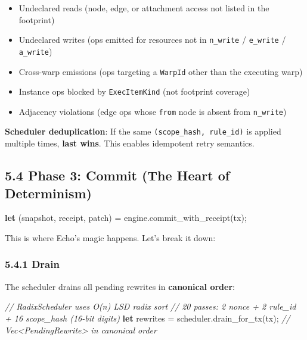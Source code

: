 \documentclass[
]{book}
\newenvironment{Shaded}{}{}
\newcommand{\CommentTok}[1]{\textcolor[rgb]{0.38,0.63,0.69}{\textit{#1}}}
\newcommand{\KeywordTok}[1]{\textcolor[rgb]{0.00,0.44,0.13}{\textbf{#1}}}
\newcommand{\NormalTok}[1]{#1}
\newcommand{\OperatorTok}[1]{\textcolor[rgb]{0.40,0.40,0.40}{#1}}
\begin{document}
\begin{itemize}
\item Undeclared reads (node, edge, or attachment access not listed in the footprint)
\item Undeclared writes (ops emitted for resources not in \texttt{n\_write} / \texttt{e\_write} / \texttt{a\_write})
\item Cross-warp emissions (ops targeting a \texttt{WarpId} other than the executing warp)
\item Instance ops blocked by \texttt{ExecItemKind} (not footprint coverage)
\item Adjacency violations (edge ops whose \texttt{from} node is absent from \texttt{n\_write})
\end{itemize}

\textbf{Scheduler deduplication}: If the same
\texttt{(scope\_hash,\ rule\_id)} is applied multiple times,
\textbf{last wins}. This enables idempotent retry semantics.

\subsection{5.4 Phase 3: Commit (The Heart of
Determinism)}\label{phase-3-commit-the-heart-of-determinism}

\begin{Shaded}
\begin{Highlighting}[]
\KeywordTok{let}\NormalTok{ (snapshot}\OperatorTok{,}\NormalTok{ receipt}\OperatorTok{,}\NormalTok{ patch) }\OperatorTok{=}\NormalTok{ engine}\OperatorTok{.}\NormalTok{commit\_with\_receipt(tx)}\OperatorTok{;}
\end{Highlighting}
\end{Shaded}

This is where Echo's magic happens. Let's break it down:

\subsubsection{5.4.1 Drain}\label{drain}

The scheduler drains all pending rewrites in \textbf{canonical order}:

\begin{Shaded}
\begin{Highlighting}[]
\CommentTok{// RadixScheduler uses O(n) LSD radix sort}
\CommentTok{// 20 passes: 2 nonce + 2 rule\_id + 16 scope\_hash (16{-}bit digits)}
\KeywordTok{let}\NormalTok{ rewrites }\OperatorTok{=}\NormalTok{ scheduler}\OperatorTok{.}\NormalTok{drain\_for\_tx(tx)}\OperatorTok{;}  \CommentTok{// Vec\textless{}PendingRewrite\textgreater{} in canonical order}
\end{Highlighting}
\end{Shaded}
\end{document}
